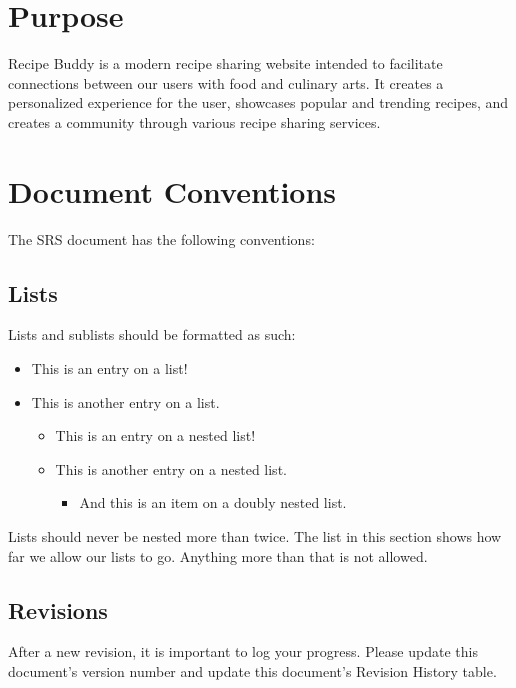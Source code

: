 \documentclass{scrreprt}
\begin{document}
\section{Purpose}
$ $\gls{Recipe Buddy} is a modern recipe sharing website intended to facilitate connections between our users with food and culinary arts.
It creates a personalized experience for the user, showcases popular and trending recipes, and creates a community through various recipe sharing services.$ $

\section{Document Conventions}
$ $The SRS document has the following conventions:$ $
\subsection{Lists}
$ $Lists and sublists should be formatted as such:
\begin{itemize}
    \item This is an entry on a list!
    \item This is another entry on a list.
          \begin{itemize}
              \item This is an entry on a nested list!
              \item This is another entry on a nested list.
                    \begin{itemize}
                        \item And this is an item on a doubly nested list.
                    \end{itemize}
          \end{itemize}
\end{itemize}
Lists should never be nested more than twice.
The list in this section shows how far we allow our lists to go.
Anything more than that is not allowed.

\subsection{Revisions}
After a new revision, it is important to log your progress.
Please update this document's version number and update this document's Revision History table.
\end{document}
